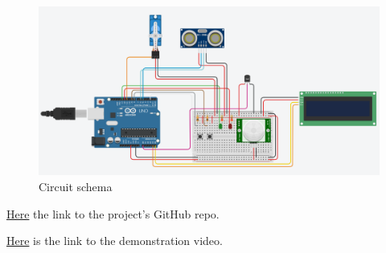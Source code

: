 \documentclass[a4paper,12pt]{report}
\begin{document}
    \begin{figure}[H]
        \centering{}
            \includegraphics[width=\textwidth]{img/Assignment-02_SWDS-Schema.png}
        \caption{Circuit schema}
        \label{img:schema}
    \end{figure}
    
    \centerline{\href{https://github.com/Cinels/IoT-assignment-02}{Here} the link to the project's GitHub repo.}
    \centerline{\href{https://drive.google.com/file/d/1d6b1z2RUoSSoMtx6eu3L8nykpJ6HNov7/view?usp=drive_link}{Here} is the link to the demonstration video.}
\end{document}
